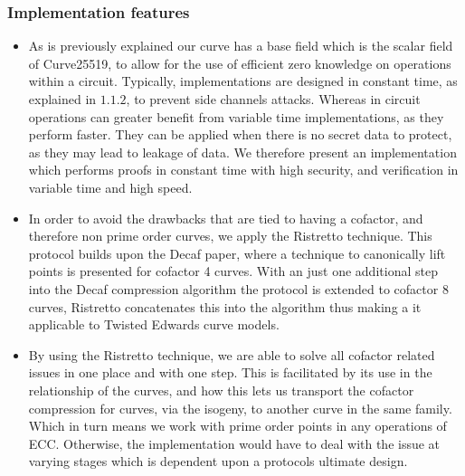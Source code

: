 \documentclass{article}
\begin{document}
\subsubsection{Implementation features}
\begin{itemize}
    \item As is previously explained our curve has a base field which is the scalar field of Curve25519, to allow for the use of efficient zero knowledge on operations within a circuit. Typically, implementations are designed in constant time, as explained in $1.1.2$, to prevent side channels attacks. Whereas in circuit operations can greater benefit from variable time implementations, as they perform faster. They can be applied when there is no secret data to protect, as they may lead to leakage of data. We therefore present an implementation which performs proofs in constant time with high security, and  verification in variable time and high speed. \\ 
    \item In order to avoid the drawbacks that are tied to having a cofactor, and therefore non prime order curves, we apply the Ristretto technique. This protocol builds upon the Decaf paper, where a technique to canonically lift points is presented for cofactor 4 curves. With an just one additional step into the Decaf compression algorithm the protocol is extended to cofactor 8 curves, Ristretto concatenates this into the algorithm thus making a it applicable to Twisted Edwards curve models.\\
    \item By using the Ristretto technique, we are able to solve all cofactor related issues in one place and with one step. This is facilitated by its use in the relationship of the curves, and how this lets us transport the cofactor compression for curves, via the isogeny, to another curve in the same family. Which in turn means we work with prime order points in any operations of ECC. Otherwise, the implementation would have to deal with the issue at varying stages which is dependent upon a protocols ultimate design. \\
\end{itemize}
\end{document}
